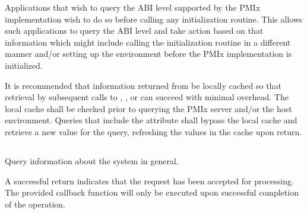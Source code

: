 \rationalestart
Applications that wish to query the \ac{ABI} level supported by the \ac{PMIx} implementation wish to do so before calling any initialization routine.
This allows such applications to query the \ac{ABI} level and take action based on that information which might include calling the initialization routine in a different manner and/or setting up the environment before the \ac{PMIx} implementation is initialized.
\rationaleend

\adviceimplstart
It is recommended that information returned from  be locally cached so that retrieval by subsequent calls to , , or  can succeed with minimal overhead. The local cache shall be checked prior to querying the \ac{PMIx} server and/or the host environment. Queries that include the  attribute shall bypass the local cache and retrieve a new value for the query, refreshing the values in the cache upon return.
\adviceimplend


\subsection{}

\summary

Query information about the system in general.

\format


\begin{arglist}
\end{arglist}

A successful return indicates that the request has been accepted for processing.
The provided callback function will only be executed upon successful completion of the operation.

